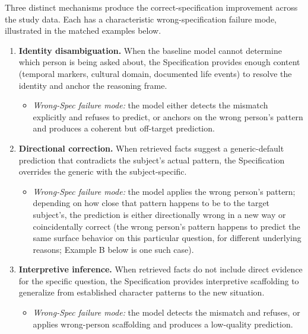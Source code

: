Three distinct mechanisms produce the correct-specification improvement
across the study data. Each has a characteristic wrong-specification
failure mode, illustrated in the matched examples below.

\begin{enumerate}
\def\labelenumi{\arabic{enumi}.}
\tightlist
\item
  \textbf{Identity disambiguation.} When the baseline model cannot
  determine which person is being asked about, the Specification
  provides enough content (temporal markers, cultural domain, documented
  life events) to resolve the identity and anchor the reasoning frame.

  \begin{itemize}
  \tightlist
  \item
    \emph{Wrong-Spec failure mode:} the model either detects the
    mismatch explicitly and refuses to predict, or anchors on the wrong
    person's pattern and produces a coherent but off-target prediction.
  \end{itemize}
\item
  \textbf{Directional correction.} When retrieved facts suggest a
  generic-default prediction that contradicts the subject's actual
  pattern, the Specification overrides the generic with the
  subject-specific.

  \begin{itemize}
  \tightlist
  \item
    \emph{Wrong-Spec failure mode:} the model applies the wrong person's
    pattern; depending on how close that pattern happens to be to the
    target subject's, the prediction is either directionally wrong in a
    new way or coincidentally correct (the wrong person's pattern
    happens to predict the same surface behavior on this particular
    question, for different underlying reasons; Example B below is one
    such case).
  \end{itemize}
\item
  \textbf{Interpretive inference.} When retrieved facts do not include
  direct evidence for the specific question, the Specification provides
  interpretive scaffolding to generalize from established character
  patterns to the new situation.

  \begin{itemize}
  \tightlist
  \item
    \emph{Wrong-Spec failure mode:} the model detects the mismatch and
    refuses, or applies wrong-person scaffolding and produces a
    low-quality prediction.
  \end{itemize}
\end{enumerate}

